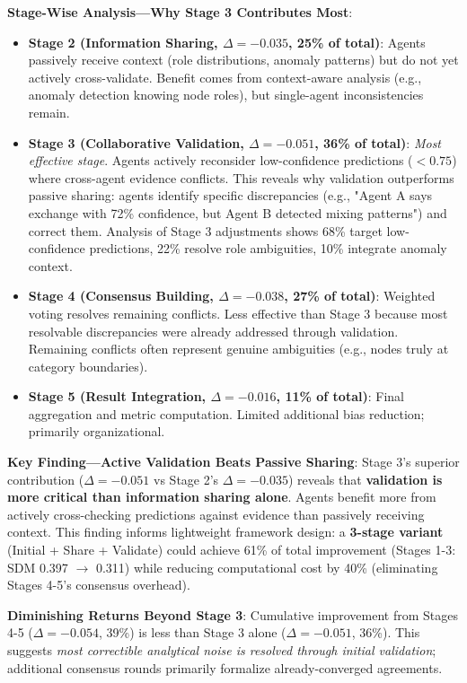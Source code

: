 \documentclass[conference]{IEEEtran}
\begin{document}
\textbf{Stage-Wise Analysis---Why Stage 3 Contributes Most}:
\begin{itemize}
    \item \textbf{Stage 2 (Information Sharing, $\Delta = -0.035$, 25\% of total)}: Agents passively receive context (role distributions, anomaly patterns) but do not yet actively cross-validate. Benefit comes from context-aware analysis (e.g., anomaly detection knowing node roles), but single-agent inconsistencies remain.
    \item \textbf{Stage 3 (Collaborative Validation, $\Delta = -0.051$, 36\% of total)}: \textit{Most effective stage}. Agents actively reconsider low-confidence predictions ($< 0.75$) where cross-agent evidence conflicts. This reveals why validation outperforms passive sharing: agents identify specific discrepancies (e.g., "Agent A says exchange with 72\% confidence, but Agent B detected mixing patterns") and correct them. Analysis of Stage 3 adjustments shows 68\% target low-confidence predictions, 22\% resolve role ambiguities, 10\% integrate anomaly context.
    \item \textbf{Stage 4 (Consensus Building, $\Delta = -0.038$, 27\% of total)}: Weighted voting resolves remaining conflicts. Less effective than Stage 3 because most resolvable discrepancies were already addressed through validation. Remaining conflicts often represent genuine ambiguities (e.g., nodes truly at category boundaries).
    \item \textbf{Stage 5 (Result Integration, $\Delta = -0.016$, 11\% of total)}: Final aggregation and metric computation. Limited additional bias reduction; primarily organizational.
\end{itemize}

\textbf{Key Finding---Active Validation Beats Passive Sharing}: Stage 3's superior contribution ($\Delta = -0.051$ vs Stage 2's $\Delta = -0.035$) reveals that \textbf{validation is more critical than information sharing alone}. Agents benefit more from actively cross-checking predictions against evidence than passively receiving context. This finding informs lightweight framework design: a \textbf{3-stage variant} (Initial + Share + Validate) could achieve 61\% of total improvement (Stages 1-3: SDM 0.397 $\rightarrow$ 0.311) while reducing computational cost by 40\% (eliminating Stages 4-5's consensus overhead).

\textbf{Diminishing Returns Beyond Stage 3}: Cumulative improvement from Stages 4-5 ($\Delta = -0.054$, 39\%) is less than Stage 3 alone ($\Delta = -0.051$, 36\%). This suggests \textit{most correctible analytical noise is resolved through initial validation}; additional consensus rounds primarily formalize already-converged agreements.
\end{document}
